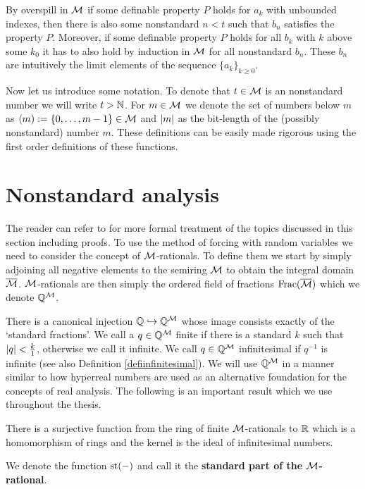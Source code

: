 By overspill in $\mathcal{M}$ if some definable property $P$ holds for $a_k$ with unbounded indexes, then there is also some nonstandard $n<t$ such that $b_n$ satisfies the property $P$. Moreover, if some definable property $P$ holds for all $b_k$ with $k$ above some $k_0$ it has to also hold by induction in $\mathcal{M}$ for all nonstandard $b_n$. These $b_n$ are intuitively the limit elements of the sequence $\{a_k\}_{k\geq0}$.

Now let us introduce some notation. To denote that $t\in\mathcal{M}$ is an nonstandard number we will write $t>\mathbb{N}$. For $m\in\mathcal{M}$ we denote the set of numbers below $m$ as $\langle m):=\{0,\dots,m-1\}\in\mathcal{M}$ and $\left|{m}\right|$ as the bit-length of the (possibly nonstandard) number $m$. These definitions can be easily made rigorous using the first order definitions of these functions. 

\section*{Nonstandard analysis}

The reader can refer to \cite{goldbring2014lecture} for more formal treatment of the topics discussed in this section including proofs. To use the method of forcing with random variables we need to consider the concept of $\mathcal{M}$-rationals. To define them we start by simply adjoining all negative elements to the semiring $\mathcal{M}$ to obtain the integral domain $\overline {\mathcal{M}}$. $\mathcal{M}$-rationals are then simply the ordered field of fractions $\text{Frac}(\overline {\mathcal{M}})$ which we denote $\mathbb{Q}^{\mathcal{M}}$.

There is a canonical injection $\mathbb{Q} \hookrightarrow \mathbb{Q}^{\mathcal{M}}$ whose image consists exactly of the `standard fractions'. We call a $q\in\mathbb{Q}^{\mathcal{M}}$ finite if there is a standard $k$ such that $\left|{q}\right|<\frac{k}{1}$, otherwise we call it infinite. We call $q\in\mathbb{Q}^{\mathcal{M}}$ infinitesimal if $q^{-1}$ is infinite (see also Definition \ref{defiinfinitesimal}). We will use $\mathbb{Q}^{\mathcal{M}}$ in a manner similar to how hyperreal numbers are used as an alternative foundation for the concepts of real analysis. The following is an important result which we use throughout the thesis.

\begin{thrm*}
There is a surjective function from the ring of finite $\mathcal{M}$-rationals to $\mathbb{R}$ which is a homomorphism of rings and the kernel is the ideal of infinitesimal numbers.

We denote the function $\text{st}(-)$ and call it the \textbf{standard part of the $\mathcal{M}$-rational}.
\end{thrm*}

